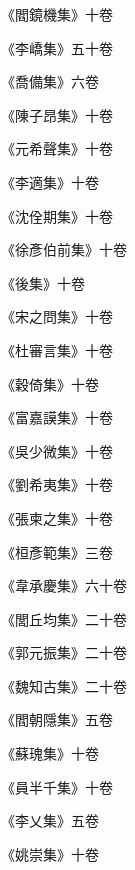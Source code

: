 \begin{pinyinscope}
 《閻鏡機集》十卷



 《李嶠集》五十卷



 《喬備集》六卷



 《陳子昂集》十卷



 《元希聲集》十卷



 《李適集》十卷



 《沈佺期集》十卷



 《徐彥伯前集》十卷



 《後集》十卷



 《宋之問集》十卷



 《杜審言集》十卷



 《穀倚集》十卷



 《富嘉謨集》十卷



 《吳少微集》十卷



 《劉希夷集》十卷



 《張柬之集》十卷



 《桓彥範集》三卷



 《韋承慶集》六十卷



 《閭丘均集》二十卷



 《郭元振集》二十卷



 《魏知古集》二十卷



 《閻朝隱集》五卷



 《蘇瑰集》十卷



 《員半千集》十卷



 《李乂集》五卷



 《姚崇集》十卷




\end{pinyinscope}
